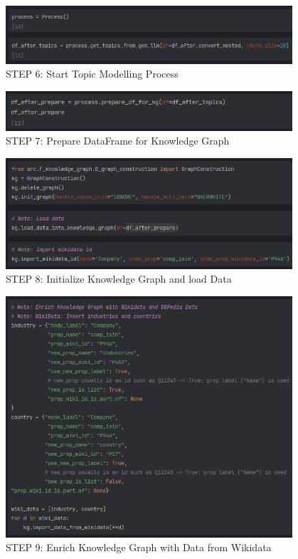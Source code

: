 \begin{figure}[H]   %
    \centering
    \includegraphics[width=0.95\textwidth]{Assets/main-6}
    \caption{STEP 6: Start Topic Modelling Process}
    \label{fig:main-6}
\end{figure}
\begin{figure}[H]   %
    \centering
    \includegraphics[width=0.95\textwidth]{Assets/main-7}
    \caption{STEP 7: Prepare DataFrame for Knowledge Graph}
    \label{fig:main-7}
\end{figure}
\begin{figure}[H]   %
    \centering
    \includegraphics[width=0.95\textwidth]{Assets/main-8}
    \caption{STEP 8: Initialize Knowledge Graph and load Data}
    \label{fig:main-8}
\end{figure}
\begin{figure}[H]   %
    \centering
    \includegraphics[width=0.95\textwidth]{Assets/main-9}
    \caption{STEP 9: Enrich Knowledge Graph with Data from Wikidata}
    \label{fig:main-9}
\end{figure}
